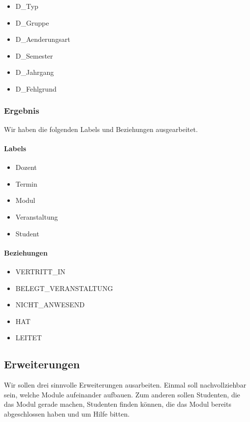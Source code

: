 \begin{itemize}
	\item D\_Typ
	\item D\_Gruppe
	\item D\_Aenderungsart
	\item D\_Semester
	\item D\_Jahrgang
	\item D\_Fehlgrund	
\end{itemize}

\vspace{12pt}

\subsubsection{Ergebnis}
Wir haben die folgenden Labels und Beziehungen ausgearbeitet.

\vspace{6pt}

\paragraph{Labels}
\begin{itemize}
	\item Dozent
	\item Termin
	\item Modul
	\item Veranstaltung
	\item Student
\end{itemize}

\vspace{6pt}

\paragraph{Beziehungen}
\begin{itemize}
	\item VERTRITT\_IN
	\item BELEGT\_VERANSTALTUNG
	\item NICHT\_ANWESEND
	\item HAT
	\item LEITET
\end{itemize}

\newpage

\subsection{Erweiterungen}
Wir sollen drei sinnvolle Erweiterungen ausarbeiten. Einmal soll nachvollziehbar sein, welche Module aufeinander aufbauen. Zum anderen sollen Studenten, die das Modul gerade machen, Studenten finden können, die das Modul bereits abgeschlossen haben und um Hilfe bitten. 

